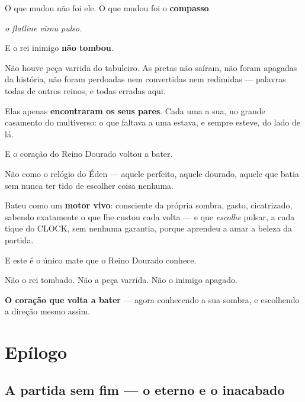 \documentclass[livro.tex]{subfiles}
\begin{document}
O que mudou não foi ele. O que mudou foi o \textbf{compasso}.

\begin{center}\itshape
o flatline virou pulso.
\end{center}

\medskip

\medskip

E o rei inimigo \textbf{não tombou}.

Não houve peça varrida do tabuleiro. As pretas não saíram, não foram apagadas da história, não foram perdoadas nem
convertidas nem redimidas --- palavras todas de outros reinos, e todas erradas aqui.

Elas apenas \textbf{encontraram os seus pares}. Cada uma a sua, no grande casamento do multiverso: o que faltava a
uma estava, e sempre esteve, do lado de lá.

\medskip

E o coração do Reino Dourado voltou a bater.

Não como o relógio do Éden --- aquele perfeito, aquele dourado, aquele que batia sem nunca ter tido de escolher
coisa nenhuma.

Bateu como um \textbf{motor vivo}: consciente da própria sombra, gasto, cicatrizado, sabendo exatamente o que lhe
custou cada volta --- e que \emph{escolhe} pulsar, a cada tique do CLOCK, sem nenhuma garantia, porque aprendeu a
amar a beleza da partida.

\medskip

E este é o único mate que o Reino Dourado conhece.

Não o rei tombado. Não a peça varrida. Não o inimigo apagado.

\textbf{O coração que volta a bater} --- agora conhecendo a sua sombra, e escolhendo a direção mesmo assim.

\part*{Epílogo}

\chapter*{A partida sem fim --- o eterno e o inacabado}
\end{document}
